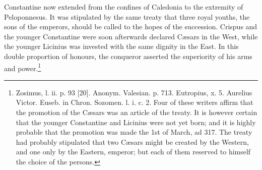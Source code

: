 Constantine now extended from the confines of Caledonia to the extremity of Peloponnesus. It was stipulated by the same treaty that three royal youths, the sons of the emperors, should be called to the hopes of the succession. Crispus and the younger Constantine were soon afterwards declared Cæsars in the West, while the younger Licinius was invested with the same dignity in the East. In this double proportion of honours, the conqueror asserted the superiority of his arms and power.\footnote{Zosimus, l. ii. p. 93 [20]. Anonym. Valesian. p. 713. Eutropius, x. 5. Aurelius Victor. Euseb. in Chron. Sozomen. l. i. c. 2. Four of these writers affirm that the promotion of the Cæsars was an article of the treaty. It is however certain that the younger Constantine and Licinius were not yet born; and it is highly probable that the promotion was made the 1st of March, ad 317. The treaty had probably stipulated that two Cæsars might be created by the Western, and one only by the Eastern, emperor; but each of them reserved to himself the choice of the persons.}


